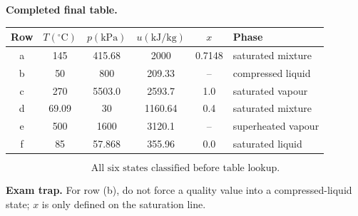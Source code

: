 \textbf{Completed final table.}
\begin{center}\small
\begin{tabular}{cccccl}
\toprule
Row & $T(^\circ\mathrm{C})$ & $p(\mathrm{kPa})$ & $u(\mathrm{kJ/kg})$ & $x$ & Phase \\
\midrule
a & 145 & 415.68 & 2000 & 0.7148 & saturated mixture \\
b & 50 & 800 & 209.33 & -- & compressed liquid \\
c & 270 & 5503.0 & 2593.7 & 1.0 & saturated vapour \\
d & 69.09 & 30 & 1160.64 & 0.4 & saturated mixture \\
e & 500 & 1600 & 3120.1 & -- & superheated vapour \\
f & 85 & 57.868 & 355.96 & 0.0 & saturated liquid \\
\bottomrule
\end{tabular}
\end{center}
\[\boxed{\text{All six states classified before table lookup.}}\]

\textbf{Exam trap.} For row (b), do not force a quality value into a compressed-liquid state; $x$ is only defined on the saturation line.
